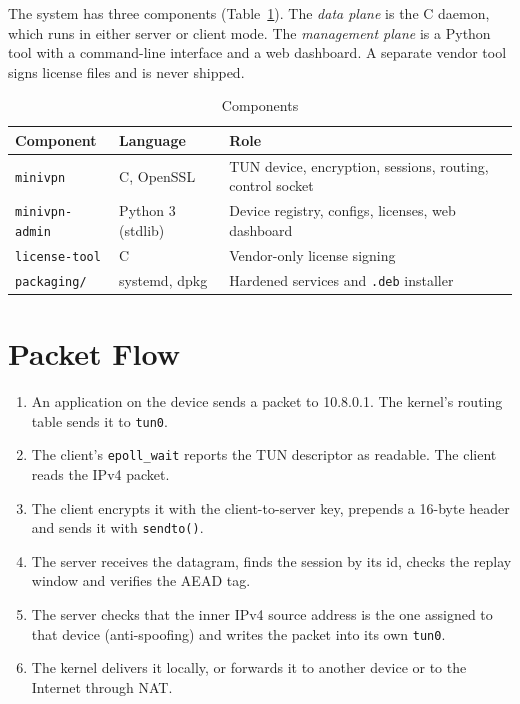\documentclass[12pt,a4paper]{report}
\begin{document}
The system has three components (Table~\ref{tab:components}). The \emph{data plane} is
the C daemon, which runs in either server or client mode. The \emph{management plane} is
a Python tool with a command-line interface and a web dashboard. A separate vendor tool
signs license files and is never shipped.

\begin{table}[H]
\centering
\caption{Components}
\label{tab:components}
\begin{tabularx}{\textwidth}{@{}llX@{}}
\toprule
\textbf{Component} & \textbf{Language} & \textbf{Role}\\
\midrule
\texttt{minivpn} & C, OpenSSL & TUN device, encryption, sessions, routing, control socket\\
\texttt{minivpn-admin} & Python 3 (stdlib) & Device registry, configs, licenses, web dashboard\\
\texttt{license-tool} & C & Vendor-only license signing\\
\texttt{packaging/} & systemd, dpkg & Hardened services and \texttt{.deb} installer\\
\bottomrule
\end{tabularx}
\end{table}

\section{Packet Flow}
\begin{enumerate}
  \item An application on the device sends a packet to 10.8.0.1. The kernel's routing
        table sends it to \texttt{tun0}.
  \item The client's \texttt{epoll\_wait} reports the TUN descriptor as readable. The client
        reads the IPv4 packet.
  \item The client encrypts it with the client-to-server key, prepends a 16-byte header and
        sends it with \texttt{sendto()}.
  \item The server receives the datagram, finds the session by its id, checks the replay
        window and verifies the AEAD tag.
  \item The server checks that the inner IPv4 source address is the one assigned to that
        device (anti-spoofing) and writes the packet into its own \texttt{tun0}.
  \item The kernel delivers it locally, or forwards it to another device or to the Internet
        through NAT.
\end{enumerate}
\end{document}
